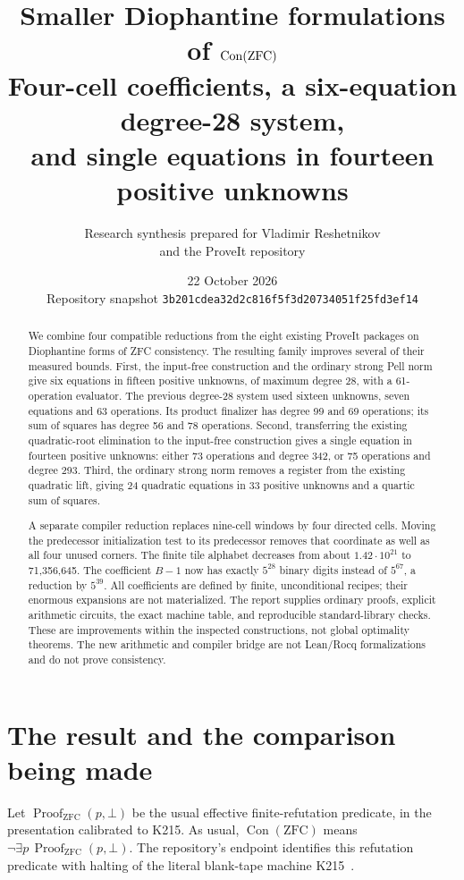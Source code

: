 \documentclass[11pt,a4paper]{article}
\title{\textbf{Smaller Diophantine formulations of \(\Con(\mathrm{ZFC})\)}\\[5pt]
 \large Four-cell coefficients, a six-equation degree-28 system,\\
 and single equations in fourteen positive unknowns}
\author{Research synthesis prepared for Vladimir Reshetnikov\\
 and the ProveIt repository}
\date{22 October 2026\\[3pt]\small
 Repository snapshot \texttt{3b201cdea32d2c816f5f3d20734051f25fd3ef14}}
\theoremstyle{remark}\newtheorem{remark}[theorem]{Remark}
\newcommand{\Con}{\operatorname{Con}}
\begin{document}
\maketitle
\begin{abstract}
We combine four compatible reductions from the eight existing ProveIt
packages on Diophantine forms of ZFC consistency. The resulting family
improves several of their measured bounds. First, the input-free
construction and the ordinary strong Pell norm give six equations in
fifteen positive unknowns, of maximum degree 28, with a 61-operation
evaluator. The previous degree-28 system used sixteen unknowns, seven
equations and 63 operations. Its product finalizer has degree 99 and
69 operations; its sum of squares has degree 56 and 78 operations.
Second, transferring the existing quadratic-root elimination to the
input-free construction gives a single equation in fourteen positive
unknowns: either 73 operations and degree 342, or 75 operations and
degree 293. Third, the ordinary strong norm removes a register from the
existing quadratic lift, giving 24 quadratic equations in 33 positive
unknowns and a quartic sum of squares.

A separate compiler reduction replaces nine-cell windows by four directed
cells. Moving the predecessor initialization test to its predecessor
removes that coordinate as well as all four unused corners. The finite
tile alphabet decreases from about \(1.42\cdot10^{21}\) to 71,356,645.
The coefficient \(B-1\) now has exactly \(5^{28}\) binary digits instead
of \(5^{67}\), a reduction by \(5^{39}\). All coefficients are defined
by finite, unconditional recipes; their enormous expansions are not
materialized. The report supplies ordinary proofs, explicit arithmetic
circuits, the exact machine table, and reproducible standard-library
checks. These are improvements within the inspected constructions,
not global optimality theorems. The new arithmetic and compiler bridge
are not Lean/Rocq formalizations and do not prove consistency.
\end{abstract}
\clearpage\tableofcontents\newpage

\section{The result and the comparison being made}
Let \(\operatorname{Proof}_{\mathrm{ZFC}}(p,\bot)\) be the usual effective
finite-refutation predicate, in the presentation calibrated to K215.
As usual, \(\Con(\mathrm{ZFC})\) means
\(\neg\exists p\,\operatorname{Proof}_{\mathrm{ZFC}}(p,\bot)\).
The repository's endpoint identifies this refutation predicate with
halting of the literal blank-tape machine K215~\cite{endpoint}.
\end{document}
